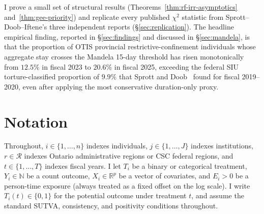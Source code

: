 \documentclass[11pt,a4paper]{article}
\theoremstyle{plain}
\theoremstyle{definition}
\theoremstyle{remark}
\newcommand{\R}{\mathbb{R}}
\newcommand{\N}{\mathbb{N}}
\begin{document}
I prove a small set of structural results
(Theorems~\ref{thm:rf-irr-asymptotics} and~\ref{thm:gee-priority})
and replicate every published $\chi^{2}$ statistic from
Sprott--Doob--Iftene's three independent reports
(\S\ref{sec:replication}). The headline empirical finding,
reported in \S\ref{sec:findings} and discussed in
\S\ref{sec:mandela}, is that the proportion of OTIS provincial
restrictive-confinement individuals whose aggregate stay crosses
the Mandela 15-day threshold has risen monotonically from
$12.5\%$ in fiscal 2023 to $20.6\%$ in fiscal 2025, exceeding the
federal SIU torture-classified proportion of $9.9\%$ that Sprott
and Doob~\cite{SprottDoob2021Torture} found for fiscal 2019--2020,
even after applying the most conservative duration-only proxy.

\section{Notation}
\label{sec:notation}

Throughout, $i \in \{1, \ldots, n\}$ indexes individuals,
$j \in \{1, \ldots, J\}$ indexes institutions, $r \in \mathcal{R}$
indexes Ontario administrative regions or CSC federal regions, and
$t \in \{1, \ldots, T\}$ indexes fiscal years. I let $T_{i}$ be a
binary or categorical treatment, $Y_{i} \in \N$ be a count
outcome, $X_{i} \in \R^{p}$ be a vector of covariates, and
$E_{i} > 0$ be a person-time exposure (always treated as a fixed
offset on the log scale). I write
$T_{i}(t)\in\{0,1\}$ for the potential outcome under treatment
$t$, and assume the standard SUTVA, consistency, and positivity
conditions throughout.
\end{document}
